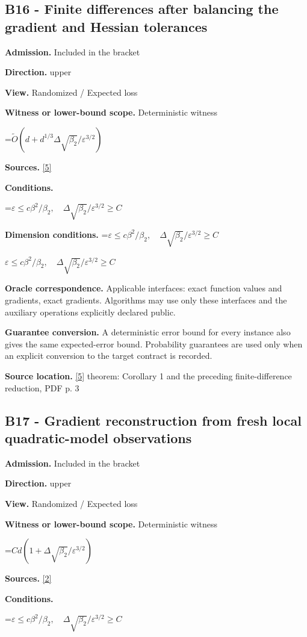 \documentclass[10pt,a4paper]{article}
\newcommand{\AtlasMath}[1]{\par\begingroup\centering\setbox0=\hbox{$\displaystyle #1$}\ifdim\wd0>1.4\linewidth\typeout{ATLAS WIDE FORMULA: \the\wd0}\fi\ifdim\wd0>\linewidth\resizebox{\linewidth}{!}{\box0}\else\box0\fi\par\endgroup}
\newcommand{\AtlasInlineMath}[1]{\begingroup\setbox0=\hbox{$#1$}\ifdim\wd0>.4\linewidth\endgroup\AtlasMath{#1}\else\endgroup$#1$\fi}
\begin{document}
\subsection{B16 - Finite differences after balancing the gradient and Hessian tolerances}
\textbf{Admission.} Included in the bracket

\textbf{Direction.} upper

\textbf{View.} Randomized / Expected loss

\textbf{Witness or lower-bound scope.} Deterministic witness

\AtlasMath{\widetilde{O}(d+d^{1/3}\Delta\sqrt{\beta_2}/\varepsilon^{3/2})}
\textbf{Sources.} \href{https://arxiv.org/pdf/2510.20786}{[5]}

\textbf{Conditions.} 
\AtlasMath{\varepsilon\le c\beta^2/\beta_2,\quad\Delta\sqrt{\beta_2}/\varepsilon^{3/2}\ge C}


\textbf{Dimension conditions.} \AtlasInlineMath{\varepsilon\le c\beta^2/\beta_2,\quad\Delta\sqrt{\beta_2}/\varepsilon^{3/2}\ge C}

\textbf{Oracle correspondence.} Applicable interfaces: exact function values and gradients, exact gradients. Algorithms may use only these interfaces and the auxiliary operations explicitly declared public.

\textbf{Guarantee conversion.} A deterministic error bound for every instance also gives the same expected-error bound. Probability guarantees are used only when an explicit conversion to the target contract is recorded.

\textbf{Source location.} \href{https://arxiv.org/pdf/2510.20786}{[5]} theorem: Corollary 1 and the preceding finite-difference reduction, PDF p. 3

\subsection{B17 - Gradient reconstruction from fresh local quadratic-model observations}
\textbf{Admission.} Included in the bracket

\textbf{Direction.} upper

\textbf{View.} Randomized / Expected loss

\textbf{Witness or lower-bound scope.} Deterministic witness

\AtlasMath{Cd(1+\Delta\sqrt{\beta_2}/\varepsilon^{3/2})}
\textbf{Sources.} \href{https://arxiv.org/pdf/2610.02791}{[2]}

\textbf{Conditions.} 
\AtlasMath{\varepsilon\le c\beta^2/\beta_2,\quad\Delta\sqrt{\beta_2}/\varepsilon^{3/2}\ge C}
\end{document}

